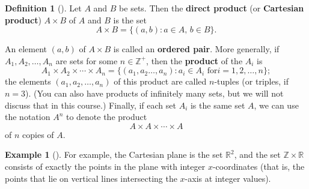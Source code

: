 \documentclass[10pt,]{book}
\newcommand{\terminology}[1]{\textbf{#1}}
\theoremstyle{plain}
\theoremstyle{definition}
\newtheorem{definition}[theorem]{Definition}
\theoremstyle{definition}
\theoremstyle{definition}
\newtheorem{example}[theorem]{Example}
\theoremstyle{definition}
\numberwithin{equation}{section}
\def\Z{\mathbb{Z}}
\def\R{\mathbb{R}}
\begin{document}
\begin{definition}[{}]\label{definition-7}
\label{notation-22}
Let \(A\) and \(B\) be sets. Then the \terminology{direct product} (or \terminology{Cartesian product}) \(A\times B\) of \(A\) and \(B\) is the set%
\begin{equation*}
A\times B =\{(a,b): \text{\(a\in A\), \(b\in B\)} \}.
\end{equation*}
%
\par
An element \((a,b)\) of \(A\times B\) is called an \terminology{ordered pair}. More generally, if \(A_1, A_2, \ldots, A_n\) are sets for some \(n\in \Z^+\), then the \terminology{product} of the \(A_i\) is%
\begin{equation*}
A_1\times A_2 \times \cdots \times A_n=\{(a_1, a_2 \ldots, a_n): a_i \in A_i \text{ for
} i=1,2, \ldots, n\}; 
\end{equation*}
the elements \((a_1,a_2,\ldots,a_n)\) of this product are called \(n\)-tuples (or triples, if \(n=3\)). (You can also have products of infinitely many sets, but we will not discuss that in this course.) Finally, if each set \(A_i\) is the same set \(A\), we can use the notation \(A^n\) to denote the product%
\begin{equation*}
A\times A \times \cdots \times A
\end{equation*}
of \(n\) copies of \(A\).%
\end{definition}
\begin{example}[]\label{example-4}
For example, the Cartesian plane is the set \(\R^2\), and the set \(\Z \times \R\) consists of exactly the points in the plane with integer \(x\)-coordinates (that is, the points that lie on vertical lines intersecting the \(x\)-axis at integer values).%
\end{example}
\typeout{************************************************}
\typeout{************************************************}
\end{document}
